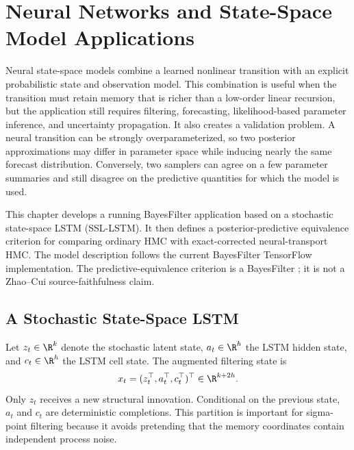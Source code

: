\chapter[Neural State-Space Model Applications]
{Neural Networks and State-Space Model Applications}
\label{ch:bf-neural-network-ssm-applications}

Neural state-space models combine a learned nonlinear transition with an
explicit probabilistic state and observation model.  This combination is
useful when the transition must retain memory that is richer than a low-order
linear recursion, but the application still requires filtering, forecasting,
likelihood-based parameter inference, and uncertainty propagation.  It also
creates a validation problem.  A neural transition can be strongly
overparameterized, so two posterior approximations may differ in parameter
space while inducing nearly the same forecast distribution.  Conversely, two
samplers can agree on a few parameter summaries and still disagree on the
predictive quantities for which the model is used.

This chapter develops a running BayesFilter application based on a stochastic
state-space LSTM (SSL-LSTM).  It then defines a posterior-predictive
equivalence criterion for comparing ordinary HMC with exact-corrected
neural-transport HMC.  The model description follows the current BayesFilter
TensorFlow implementation.  The predictive-equivalence criterion is a
BayesFilter ; it is not a Zhao--Cui
source-faithfulness claim.

\section{A Stochastic State-Space LSTM}
\label{sec:bf-ssl-lstm-model}

Let $z_t\in\R^k$ denote the stochastic latent state, $a_t\in\R^h$ the LSTM
hidden state, and $c_t\in\R^h$ the LSTM cell state.  The augmented filtering
state is
\begin{equation}
  x_t = (z_t^\top,a_t^\top,c_t^\top)^\top
  \in \R^{k+2h}.
  \label{eq:bf-ssl-lstm-state}
\end{equation}
Only $z_t$ receives a new structural innovation.  Conditional on the previous
state, $a_t$ and $c_t$ are deterministic completions.  This partition is
important for sigma-point filtering because it avoids pretending that the
memory coordinates contain independent process noise.

